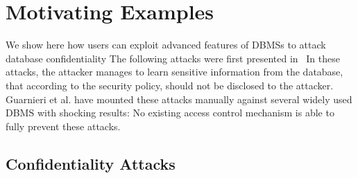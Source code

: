 \section{Motivating Examples}



We show here how users can exploit advanced features of DBMSs to attack database confidentiality
%
The following attacks were first presented in~\cite{guarnieri2016strong}
%
In these attacks, the attacker manages to learn sensitive information from the database, that according to the security policy, should not be disclosed to the attacker.
%
Guarnieri et al. have mounted these attacks manually against several widely used DBMS with shocking results: No existing access control mechanism is able to fully prevent these attacks.

\subsection{Confidentiality Attacks}

